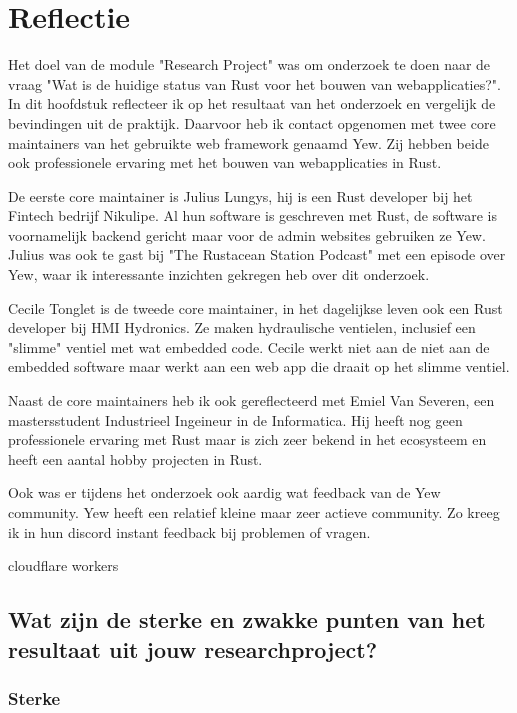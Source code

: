 \chapter{Reflectie}
\label{reflectie}

Het doel van de module "Research Project" was om onderzoek te doen naar de vraag "Wat is de huidige
status van Rust voor het bouwen van webapplicaties?". In dit hoofdstuk reflecteer ik op het
resultaat van het onderzoek en vergelijk de bevindingen uit de praktijk. Daarvoor heb ik contact
opgenomen met twee core maintainers van het gebruikte web framework genaamd Yew. Zij hebben beide
ook professionele ervaring met het bouwen van webapplicaties in Rust.

De eerste core maintainer is Julius Lungys, hij is een Rust developer bij het Fintech bedrijf
Nikulipe. Al hun software is geschreven met Rust, de software is voornamelijk backend gericht
maar voor de admin websites gebruiken ze Yew. Julius was ook te gast bij "The Rustacean Station Podcast"
met een episode over Yew, waar ik interessante inzichten gekregen heb over dit onderzoek.

Cecile Tonglet is de tweede core maintainer, in het dagelijkse leven ook een Rust developer
bij HMI Hydronics. Ze maken hydraulische ventielen, inclusief een "slimme" ventiel met wat embedded
code. Cecile werkt niet aan de niet aan de embedded software maar werkt aan een web app die draait 
op het slimme ventiel.

Naast de core maintainers heb ik ook gereflecteerd met Emiel Van Severen, een mastersstudent
Industrieel Ingeineur in de Informatica. Hij heeft nog geen professionele ervaring met Rust maar
is zich zeer bekend in het ecosysteem en heeft een aantal hobby projecten in Rust.

Ook was er tijdens het onderzoek ook aardig wat feedback van de Yew community. Yew heeft een
relatief kleine maar zeer actieve community. Zo kreeg ik in hun discord instant feedback bij
problemen of vragen.

cloudflare workers


\clearpage

\section{Wat zijn de sterke en zwakke punten van het resultaat uit jouw researchproject?}

\subsection{Sterke}

